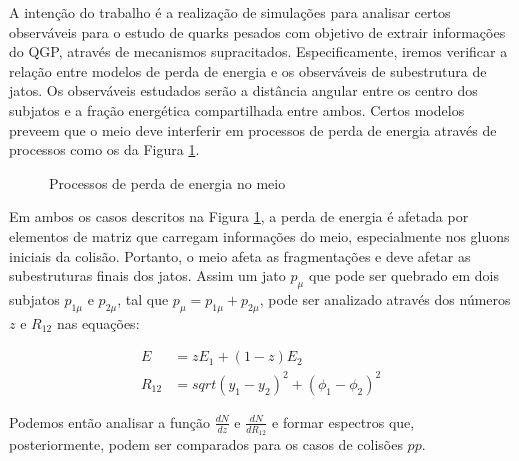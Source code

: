 A intenção do trabalho é a realização de simulações para analisar certos observáveis para o estudo de quarks pesados
com objetivo de extrair informações do QGP, através de mecanismos supracitados. Especificamente,
iremos verificar a relação entre modelos de perda de energia e os observáveis de subestrutura
de jatos. Os observáveis estudados serão a distância angular entre os centro dos subjatos e 
a fração energética compartilhada entre ambos. Certos modelos \cite{zapp_monte_2009, renk_jet_2014} preveem
que o meio deve interferir em processos de perda de energia através de processos como os da Figura \ref{proc_perd}.

\begin{figure}[!htb]
\begin{floatrow}

 
 
\end{floatrow}

\caption{Processos de perda de energia no meio}
\label{proc_perd}

\end{figure}

Em ambos os casos descritos na Figura \ref{proc_perd}, a perda de energia é afetada por elementos de matriz que carregam
informações do meio, especialmente nos gluons iniciais da colisão. Portanto, o meio afeta as fragmentações e deve afetar
as subestruturas finais dos jatos. Assim um jato $p_\mu$ que pode ser quebrado em dois subjatos $p_{1\mu}$ e $p_{2\mu}$,
tal que $p_\mu=p_{1\mu}+p_{2\mu}$, pode ser analizado através dos números $z$ e $R_{12}$ nas equações:

\begin{equation}
 \begin{split}
  E &= zE_1 + (1-z) E_2 \\
  R_{12} &= sqrt{ (y_1-y_2)^2 + (\phi_1-\phi_2)^2 }
 \end{split}
\end{equation}

Podemos então analisar a função $\frac{dN}{dz}$ e $\frac{dN}{dR_{12}}$ e formar espectros que, posteriormente, podem ser
comparados para os casos de colisões $pp$.